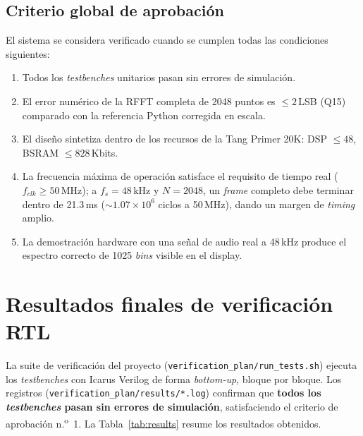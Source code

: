 \documentclass[11pt,a4paper]{article}
\begin{document}
\subsection{Criterio global de aprobación}
El sistema se considera verificado cuando se cumplen todas las condiciones
siguientes:
\begin{enumerate}[leftmargin=1.6em]
  \item Todos los \emph{testbenches} unitarios pasan sin errores de simulación.
  \item El error numérico de la RFFT completa de 2048 puntos es $\leq 2$\,LSB
    (Q15) comparado con la referencia Python corregida en escala.
  \item El diseño sintetiza dentro de los recursos de la Tang Primer 20K:
    DSP $\leq 48$, BSRAM $\leq 828$\,Kbits.
  \item La frecuencia máxima de operación satisface el requisito de tiempo real
    ($f_{clk} \geq 50$\,MHz); a $f_s = 48$\,kHz y $N = 2048$, un \emph{frame}
    completo debe terminar dentro de 21.3\,ms ($\sim 1.07\times10^6$ ciclos a
    50\,MHz), dando un margen de \emph{timing} amplio.
  \item La demostración hardware con una señal de audio real a 48\,kHz produce el
    espectro correcto de 1025 \emph{bins} visible en el display.
\end{enumerate}

\section{Resultados finales de verificación RTL}
La suite de verificación del proyecto (\texttt{verification\_plan/run\_tests.sh})
ejecuta los \emph{testbenches} con Icarus Verilog de forma \emph{bottom-up},
bloque por bloque. Los registros (\texttt{verification\_plan/results/*.log})
confirman que \textbf{todos los \emph{testbenches} pasan sin errores de
simulación}, satisfaciendo el criterio de aprobación n.\textsuperscript{o}~1.
La Tabla~\ref{tab:results} resume los resultados obtenidos.
\end{document}
